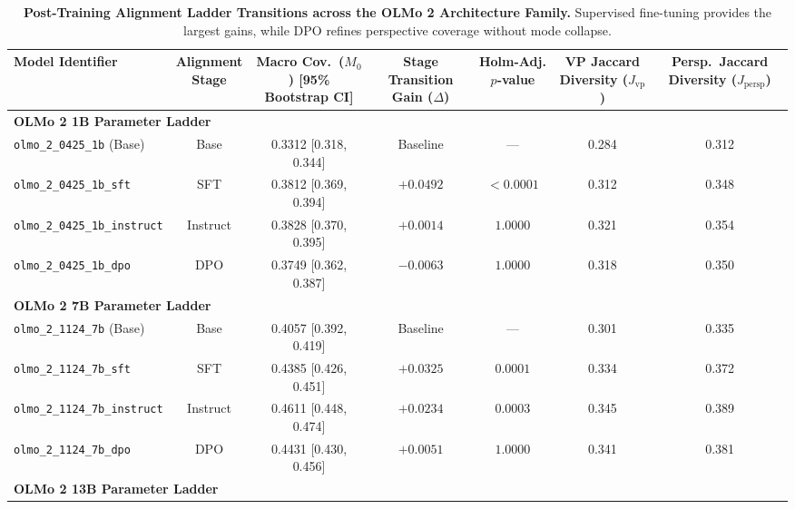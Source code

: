 \documentclass[11pt,a4paper]{article}
\begin{document}
\begin{table}[htbp]
\centering
\small
\caption{\textbf{Post-Training Alignment Ladder Transitions across the OLMo 2 Architecture Family.} Supervised fine-tuning provides the largest gains, while DPO refines perspective coverage without mode collapse.}
\label{tab:alignment_ladder}
\begin{adjustbox}{max width=\textwidth}
\begin{tabular}{l c c c c c c}
\toprule
\textbf{Model Identifier} & \makecell{\textbf{Alignment}\\\textbf{Stage}} & \makecell{\textbf{Macro Cov.~($M_0$)}\\\textbf{[95\% Bootstrap CI]}} & \makecell{\textbf{Stage Transition}\\\textbf{Gain ($\Delta$)}} & \makecell{\textbf{Holm-Adj.}\\\textbf{$p$-value}} & \makecell{\textbf{VP Jaccard}\\\textbf{Diversity ($J_{\text{vp}}$)}} & \makecell{\textbf{Persp.~Jaccard}\\\textbf{Diversity ($J_{\text{persp}}$)}} \\
\midrule
\multicolumn{7}{l}{\textbf{OLMo 2 1B Parameter Ladder}} \\
\texttt{olmo\_2\_0425\_1b} (Base) & Base & 0.3312 [0.318, 0.344] & Baseline & --- & 0.284 & 0.312 \\
\texttt{olmo\_2\_0425\_1b\_sft} & SFT & 0.3812 [0.369, 0.394] & $+0.0492$ & $< 0.0001$ & 0.312 & 0.348 \\
\texttt{olmo\_2\_0425\_1b\_instruct} & Instruct & 0.3828 [0.370, 0.395] & $+0.0014$ & $1.0000$ & 0.321 & 0.354 \\
\texttt{olmo\_2\_0425\_1b\_dpo} & DPO & 0.3749 [0.362, 0.387] & $-0.0063$ & $1.0000$ & 0.318 & 0.350 \\
\midrule
\multicolumn{7}{l}{\textbf{OLMo 2 7B Parameter Ladder}} \\
\texttt{olmo\_2\_1124\_7b} (Base) & Base & 0.4057 [0.392, 0.419] & Baseline & --- & 0.301 & 0.335 \\
\texttt{olmo\_2\_1124\_7b\_sft} & SFT & 0.4385 [0.426, 0.451] & $+0.0325$ & $0.0001$ & 0.334 & 0.372 \\
\texttt{olmo\_2\_1124\_7b\_instruct} & Instruct & 0.4611 [0.448, 0.474] & $+0.0234$ & $0.0003$ & 0.345 & 0.389 \\
\texttt{olmo\_2\_1124\_7b\_dpo} & DPO & 0.4431 [0.430, 0.456] & $+0.0051$ & $1.0000$ & 0.341 & 0.381 \\
\midrule
\multicolumn{7}{l}{\textbf{OLMo 2 13B Parameter Ladder}} \\

\end{tabular}
\end{adjustbox}
\end{table}
\end{document}

